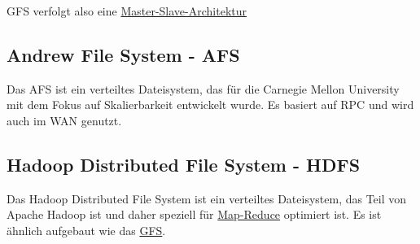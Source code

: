 GFS verfolgt also eine \hyperref[sec:master-slave]{Master-Slave-Architektur}

\subsection{Andrew File System - AFS}

Das AFS ist ein verteiltes Dateisystem, das für die Carnegie Mellon University mit dem Fokus auf Skalierbarkeit entwickelt wurde. Es basiert auf RPC und wird auch im WAN genutzt.

\subsection{Hadoop Distributed File System - HDFS}

Das Hadoop Distributed File System ist ein verteiltes Dateisystem, das Teil von Apache Hadoop ist und daher speziell für \hyperref[sec:map-reduce]{Map-Reduce} optimiert ist. Es ist ähnlich aufgebaut wie das \hyperref[sec:gfs]{GFS}.
